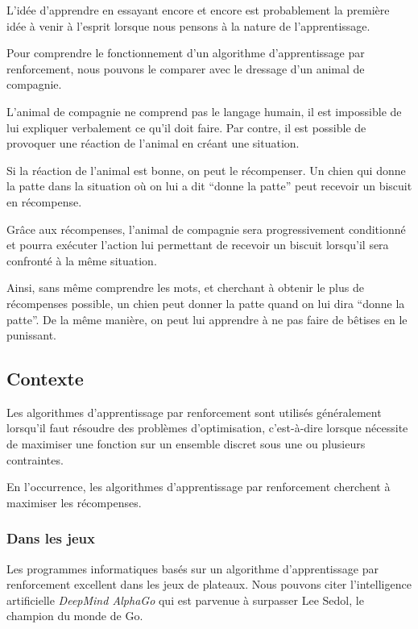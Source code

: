 \documentclass[
12pt,
french,
]{article}
\begin{document}
L'idée d'apprendre en essayant encore et encore est probablement la
première idée à venir à l'esprit lorsque nous pensons à la nature de
l'apprentissage.

Pour comprendre le fonctionnement d'un algorithme d'apprentissage par
renforcement, nous pouvons le comparer avec le dressage d'un animal de
compagnie.

L'animal de compagnie ne comprend pas le langage humain, il est
impossible de lui expliquer verbalement ce qu'il doit faire. Par contre,
il est possible de provoquer une réaction de l'animal en créant une
situation.

Si la réaction de l'animal est bonne, on peut le récompenser. Un chien
qui donne la patte dans la situation où on lui a dit ``donne la patte''
peut recevoir un biscuit en récompense.

Grâce aux récompenses, l'animal de compagnie sera progressivement
conditionné et pourra exécuter l'action lui permettant de recevoir un
biscuit lorsqu'il sera confronté à la même situation.

Ainsi, sans même comprendre les mots, et cherchant à obtenir le plus de
récompenses possible, un chien peut donner la patte quand on lui dira
``donne la patte''. De la même manière, on peut lui apprendre à ne pas
faire de bêtises en le punissant.

\hypertarget{contexte}{%
\subsection{Contexte}\label{contexte}}

Les algorithmes d'apprentissage par renforcement sont utilisés
généralement lorsqu'il faut résoudre des problèmes d'optimisation,
c'est-à-dire lorsque nécessite de maximiser une fonction sur un ensemble
discret sous une ou plusieurs contraintes.

En l'occurrence, les algorithmes d'apprentissage par renforcement
cherchent à maximiser les récompenses.

\hypertarget{dans-les-jeux}{%
\subsubsection{Dans les jeux}\label{dans-les-jeux}}

Les programmes informatiques basés sur un algorithme d'apprentissage par
renforcement excellent dans les jeux de plateaux. Nous pouvons citer
l'intelligence artificielle \emph{DeepMind AlphaGo} qui est parvenue à
surpasser Lee Sedol, le champion du monde de Go.
\end{document}
